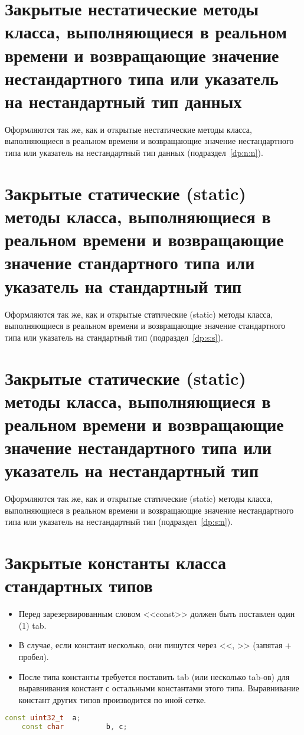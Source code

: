 \section{Закрытые нестатические методы класса, выполняющиеся в реальном времени и возвращающие значение нестандартного типа или указатель на нестандартный тип данных}\label{zp:n:n}
Оформляются так же, как и открытые нестатические методы класса, выполняющиеся в реальном времени и возвращающие значение нестандартного типа или указатель на нестандартный тип данных (подраздел~\ref{dp:n:n}).

\section{Закрытые статические (static) методы класса, выполняющиеся в реальном времени и возвращающие значение стандартного типа или указатель на стандартный тип}\label{zp:s:s}
Оформляются так же, как и открытые статические (static) методы класса, выполняющиеся в реальном времени и возвращающие значение стандартного типа или указатель на стандартный тип (подраздел~\ref{dp:s:s}).

\section{Закрытые статические (static) методы класса, выполняющиеся в реальном времени и возвращающие значение нестандартного типа или указатель на нестандартный тип}\label{zp:s:n}
Оформляются так же, как и открытые статические (static) методы класса, выполняющиеся в реальном времени и возвращающие значение нестандартного типа или указатель на нестандартный тип (подраздел~\ref{dp:s:n}).

\section{Закрытые константы класса стандартных типов}\label{zp:const:s}
\begin{itemize}
	\item Перед зарезервированным словом <<const>> должен быть поставлен один (1) tab.
	\item В случае, если констант несколько, они пишутся через <<, >> (запятая + пробел).
	\item После типа константы требуется поставить tab (или несколько tab-ов) для выравнивания констант с остальными константами этого типа. Выравнивание констант других типов производится по иной сетке.
\end{itemize}\begin{lstlisting}[language=C++, frame=tlBR, basicstyle=\fontsize{10}{10}\ttfamily]
	const uint32_t	a;
	const char			b, c;
\end{lstlisting}

